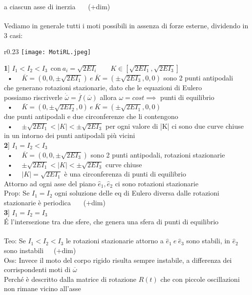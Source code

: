 \documentclass{article}
\theoremstyle{unnumbered}
\theoremstyle{unnumbered1}
\begin{document}
\phantom{Prop: }a ciascun asse di inerzia \ \ \ (+dim)\\ \\
%
%
%
Vediamo in generale tutti i moti possibili in assenza di forze esterne, dividendo in 3 casi:\ \ \ \ \ \ \ \ \ \ \ \ \ \ \ \ \ \ \ \ \ \ \ \ \ \
\begin{wrapfigure}{r}{0.23\textwidth}
\texttt{[image: MotiRL.jpeg]}
\end{wrapfigure}
%
%
%
\textbf{1}]  $I_1<I_2<I_3 \ \ \text{con} \ a_i=\sqrt{2EI_i}$ \ \ \ $K\in [\sqrt{2EI_1}, \sqrt{2EI_3}]$ \\
%
%
\ • \ \ $\overline{K}=(0,0,\pm \sqrt{2EI_1}) \ e \ \overline{K}=(\pm \sqrt{2EI_3},0,0)$ sono 2 punti antipodali\\
\phantom{\ • \ \ }che generano rotazioni stazionarie,
dato che le equazioni di Eulero\\
\phantom{\ • \ \ }possiamo riscriverle $\dot{\overline{\omega}}=\overline{f}(\overline{\omega})$ allora $\omega=cost \implies$ punti di equilibrio\\ 
\ • \ \ $\overline{K}=(0,\pm \sqrt{2EI_2},0) \ e \ \overline{K}=(\pm \sqrt{2EI_1},0,0)$\\
\phantom{\ • \ \ } due punti antipodali e due circonferenze che li contengono\\
\ • \ \ $\pm \sqrt{2EI_1}< |K|<\pm \sqrt{2EI_3}$ per ogni valore di |K| ci sono due curve chiuse\\
\phantom{\ • \ \ }in un intorno dei punti antipodali più vicini \\
%
%
%
\textbf{2}] $I_1=I_2<I_3$\\
\ • \ \ $\overline{K}=(0,0,\pm \sqrt{2EI_3})$ sono 2 punti antipodali, rotazioni stazionarie\\ 
\ • \ \ $\pm \sqrt{2EI_1}< |K|<\pm \sqrt{2EI_3}$ curve chiuse\\
\ • \ \ $|K|=\sqrt{2EI_1}$ è una circonferenza di punti di equilibrio\\
Attorno ad ogni asse del piano $\hat{e}_1, \hat{e}_2$ ci sono rotazioni stazionarie\\
%
Prop: Se $I_1=I_2$ ogni soluzione delle eq di Eulero diversa dalle rotazioni stazionarie è periodica \ \ \ (+dim)\\
%
%
%
\textbf{3}] $I_1=I_2=I_3$\\
É l'intersezione tra due sfere, che genera una sfera di punti di equilibrio\\ \\
%
%
%
Teo: Se $I_1<I_2<I_3$ le rotazioni stazionarie attorno a $\hat{e}_1 \ e \ \hat{e}_3$ sono stabili, in $\hat{e}_2$ sono instabili\ \ \ (+dim) \\
%
Oss: Invece il moto del corpo rigido risulta sempre instabile, a differenza dei corrispondenti moti di $\overline{\omega}$\\
\phantom{Oss: }Perché è descritto dalla matrice di rotazione $R(t)$ che con piccole oscillazioni non rimane vicino all'asse
%
%
%
\end{document}
